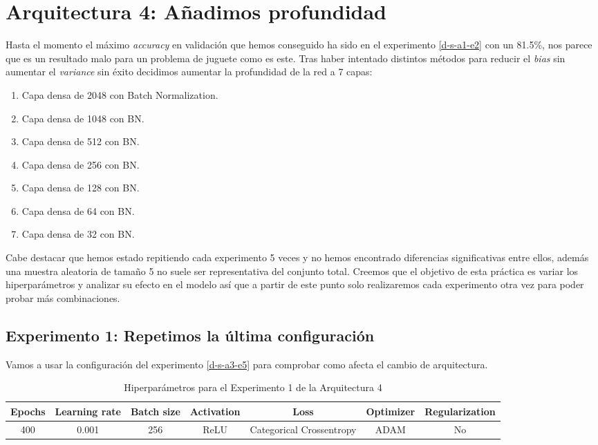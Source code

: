 \documentclass{article}
\begin{document}
	\section{Arquitectura 4: A\~nadimos profundidad}
	\label{d-s-a4}
		Hasta el momento el m\'aximo \textit{accuracy} en validaci\'on que hemos conseguido ha sido en el experimento \ref{d-s-a1-e2} con un 81.5\%, nos parece que es un resultado malo para un problema de juguete como es este. Tras haber intentado distintos m\'etodos para reducir el \textit{bias} sin aumentar el \textit{variance} sin \'exito decidimos aumentar la profundidad de la red a 7 capas:
		\begin{enumerate}
			\item Capa densa de 2048 con Batch Normalization.
			\item Capa densa de 1048 con BN.
			\item Capa densa de 512 con BN.
			\item Capa densa de 256 con BN.
			\item Capa densa de 128 con BN.
			\item Capa densa de 64 con BN.
			\item Capa densa de 32 con BN.
		\end{enumerate}
		
		Cabe destacar que hemos estado repitiendo cada experimento 5 veces y no hemos encontrado diferencias significativas entre ellos, adem\'as una muestra aleatoria de tama\~no 5 no suele ser representativa del conjunto total. Creemos que el objetivo de esta pr\'actica es variar los hiperpar\'ametros y analizar su efecto en el modelo as\'i que a partir de este punto solo realizaremos cada experimento otra vez para poder probar m\'as combinaciones.
		\newpage
		
		\subsection{Experimento 1: Repetimos la \'ultima configuraci\'on}
		\label{d-s-a4-e1}
			Vamos a usar la configuraci\'on del experimento \ref{d-s-a3-e5} para comprobar como afecta el cambio de arquitectura.
			\begin{table}[!h]
				\begin{tabular}{| c | c | c | c | c | c | c |}
					\textbf{Epochs} & \textbf{Learning rate} & \textbf{Batch size} & \textbf{Activation} & \textbf{Loss} & \textbf{Optimizer} & \textbf{Regularization} \\ \hline
					400 & 0.001 & 256 & ReLU & Categorical Crossentropy & ADAM & No
				\end{tabular}
				\caption{Hiperpar\'ametros para el Experimento 1 de la Arquitectura 4}
				\label{tab:hip-d-a4-e1}
			\end{table}
			
\end{document}
